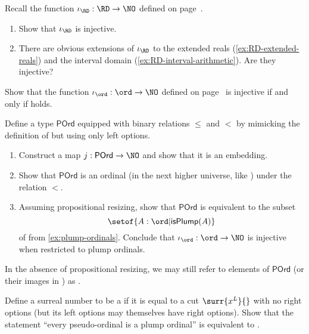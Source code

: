 \begin{ex}\label{ex:reals-into-surreals}
  Recall the function $\iota_{\RD}:\RD\to\NO$ defined on page~\pageref{reals-into-surreals}.
  \begin{enumerate}
  \item Show that $\iota_{\RD}$ is injective.
  \item There are obvious extensions of $\iota_{\RD}$ to the extended reals (\cref{ex:RD-extended-reals}) and the interval domain (\cref{ex:RD-interval-arithmetic}).
    Are they injective?
  \end{enumerate}
\end{ex}

\begin{ex}\label{ex:ord-into-surreals}
  Show that the function $\iota_{\ord}:\ord\to\NO$ defined on page~\pageref{ord-into-surreals} is injective if and only if \LEM{} holds.
\end{ex}

\begin{ex}\label{ex:hiit-plump}
  Define a type $\mathsf{POrd}$ equipped with binary relations $\le$ and $<$ by mimicking the definition of \NO but using only left options.
  \begin{enumerate}
  \item Construct a map $j:\mathsf{POrd} \to \NO$ and show that it is an embedding.
  \item Show that $\mathsf{POrd}$ is an ordinal (in the next higher universe, like \ord) under the relation $<$.
  \item Assuming propositional resizing, show that $\mathsf{POrd}$ is equivalent to the subset
    \[\setof{A:\ord | \mathsf{isPlump}(A)}\]
    of \ord from \cref{ex:plump-ordinals}.
    Conclude that $\iota_{\ord}:\ord\to\NO$ is injective when restricted to plump ordinals.
  \end{enumerate}
  In the absence of propositional resizing, we may still refer to elements of $\mathsf{POrd}$ (or their images in \NO) as .
\end{ex}

\begin{ex}\label{ex:pseudo-ordinals}
  Define a surreal number to be a  if it is equal to a cut $\surr{x^L}{}$ with no right options (but its left options may themselves have right options).
  Show that the statement ``every pseudo-ordinal is a plump ordinal'' is equivalent to \LEM{}.
\end{ex}

